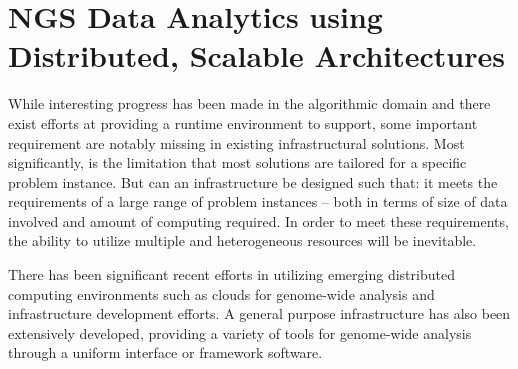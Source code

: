 \documentclass{cpeauth}
\begin{document}
\section{NGS Data Analytics using Distributed, Scalable Architectures}









While interesting progress has been made in the algorithmic domain and
there exist efforts at providing a runtime environment to support,
some important requirement are notably missing in existing
infrastructural solutions. Most significantly, is the limitation that
most solutions are tailored for a specific problem instance. But can
an infrastructure be designed such that: it meets the requirements of
a large range of problem instances -- both in terms of size of data
involved and amount of computing required.  In order to meet these
requirements, the ability to utilize multiple and heterogeneous
resources will be inevitable.

There has been significant recent efforts in utilizing emerging
distributed computing environments such as clouds for genome-wide
analysis and infrastructure development
efforts\cite{taylor2010,cloudburst, cloudblast, langmead2009,
  langmead2010,gatk, halligan2009,luyf-2010}.
A general purpose infrastructure has also been extensively developed,
providing a variety of tools for genome-wide analysis through a
uniform interface or framework software\cite{galaxy}.
\end{document}
